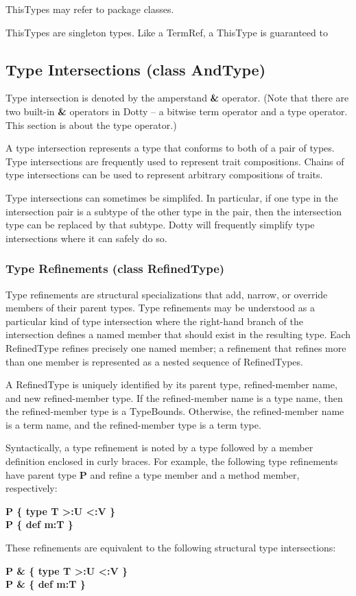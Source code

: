 \documentclass[11pt]{report}
\newcommand{\cdf}{\bf\ttfamily} %
\newcommand{\cd}{\cdf\small}  %
\begin{document}
ThisTypes may refer to package classes.

ThisTypes are singleton types. Like a TermRef, a ThisType is guaranteed to 

\subsection{Type Intersections (class AndType)} \label{sec:type-intersection}

Type intersection is denoted by the amperstand {\cd \&} operator. (Note that there are two built-in {\cd \&} operators in Dotty -- a bitwise term operator and a type operator. This section is about the type operator.) 

A type intersection represents a type that conforms to both of a pair of types. Type intersections are frequently used to represent trait compositions. Chains of type intersections can be used to represent arbitrary compositions of traits.

Type intersections can sometimes be simplifed. In particular, if one type in the intersection pair is a subtype of the other type in the pair, then the intersection type can be replaced by that subtype. Dotty will frequently simplify type intersections where it can safely do so.

\subsubsection{Type Refinements (class RefinedType)}

Type refinements are structural specializations that add, narrow, or override members of their parent types. Type refinements may be understood as a particular kind of type intersection where the right-hand branch of the intersection defines a named member that should exist in the resulting type. Each RefinedType refines precisely one named member; a refinement that refines more than one member is represented as a nested sequence of RefinedTypes.

A RefinedType is uniquely identified by its parent type, refined-member name, and new refined-member type. If the refined-member name is a type name, then the refined-member type is a TypeBounds. Otherwise, the refined-member name is a term name, and the refined-member type is a term type.

Syntactically, a type refinement is noted by a type followed by a member definition enclosed in curly braces. For example, the following type refinements have parent type {\cd P} and refine a type member and a method member, respectively:
\begin{center}
{\cd P \{ type T >:U <:V \}}\\
{\cd P \{ def m:T \}}
\end{center}
These refinements are equivalent to the following structural type intersections:
\begin{center}
{\cd P \& \{ type T >:U <:V \}}\\
{\cd P \& \{ def m:T \}}
\end{center}
\end{document}

